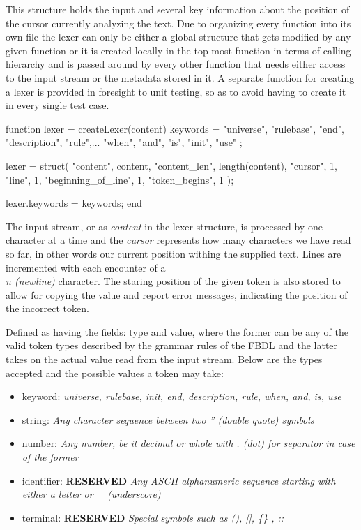 This structure holds the input and several key information about the position of the cursor currently analyzing the text. Due to organizing every function into its own file the lexer can only be either a global structure that gets modified by any given function or it is created locally in the top most function in terms of calling hierarchy and is passed around by every other function that needs either access to the input stream or the metadata stored in it. A separate function for creating a lexer is provided in foresight to unit testing, so as to avoid having to create it in every single test case.

\begin{octave}
function lexer = createLexer(content)
  keywords = {
    "universe", "rulebase", "end", "description", "rule",...
    "when", "and", "is", "init",  "use"
  };

  lexer = struct(
    "content", content,
    "content_len", length(content),
    "cursor", 1,
    "line", 1,
    "beginning_of_line", 1,
    "token_begins", 1
  );

  lexer.keywords = keywords;
end
\end{octave}

The input stream, or as \textit{content} in the lexer structure, is processed by one character at a time and the \textit{cursor} represents how many characters we have read so far, in other words our current position withing the supplied text. Lines are incremented with each encounter of a \textit{\\n (newline)} character. The staring position of the given token is also stored to allow for copying the value and report error messages, indicating the position of the incorrect token.

Defined as having the fields: type and value, where the former can be any of the valid token types described by the grammar rules of the FBDL and the latter takes on the actual value read from the input stream. Below are the types accepted and the possible values a token may take:

\begin{itemize}
	\item keyword: \textit{universe, rulebase, init, end, description, rule, when, and, is, use}
	\item string: \textit{Any character sequence between two '' (double quote) symbols}
	\item number: \textit{Any number, be it decimal or whole with . (dot) for separator in case of the former}
	\item identifier: \textbf{RESERVED} \textit{Any ASCII alphanumeric sequence starting with either a letter or \_ (underscore)}
	\item terminal: \textbf{RESERVED} \textit{Special symbols such as (), [], \{\} , ::}
\end{itemize}

